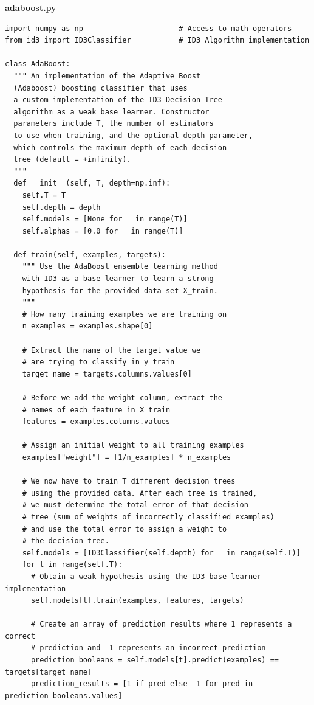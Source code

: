 \documentclass[a4paper]{article}
\begin{document}
\textbf{adaboost.py}
\begin{lstlisting}[basicstyle= \scriptsize]
import numpy as np                      # Access to math operators
from id3 import ID3Classifier           # ID3 Algorithm implementation

class AdaBoost:
  """ An implementation of the Adaptive Boost
  (Adaboost) boosting classifier that uses
  a custom implementation of the ID3 Decision Tree
  algorithm as a weak base learner. Constructor 
  parameters include T, the number of estimators
  to use when training, and the optional depth parameter,
  which controls the maximum depth of each decision
  tree (default = +infinity).
  """
  def __init__(self, T, depth=np.inf):
    self.T = T
    self.depth = depth
    self.models = [None for _ in range(T)]
    self.alphas = [0.0 for _ in range(T)]

  def train(self, examples, targets):
    """ Use the AdaBoost ensemble learning method
    with ID3 as a base learner to learn a strong 
    hypothesis for the provided data set X_train.
    """
    # How many training examples we are training on
    n_examples = examples.shape[0]

    # Extract the name of the target value we 
    # are trying to classify in y_train
    target_name = targets.columns.values[0]

    # Before we add the weight column, extract the 
    # names of each feature in X_train
    features = examples.columns.values

    # Assign an initial weight to all training examples
    examples["weight"] = [1/n_examples] * n_examples

    # We now have to train T different decision trees 
    # using the provided data. After each tree is trained,
    # we must determine the total error of that decision 
    # tree (sum of weights of incorrectly classified examples)
    # and use the total error to assign a weight to
    # the decision tree.
    self.models = [ID3Classifier(self.depth) for _ in range(self.T)]
    for t in range(self.T):
      # Obtain a weak hypothesis using the ID3 base learner implementation
      self.models[t].train(examples, features, targets)

      # Create an array of prediction results where 1 represents a correct
      # prediction and -1 represents an incorrect prediction
      prediction_booleans = self.models[t].predict(examples) == targets[target_name]
      prediction_results = [1 if pred else -1 for pred in prediction_booleans.values]


\end{lstlisting}
\end{document}
